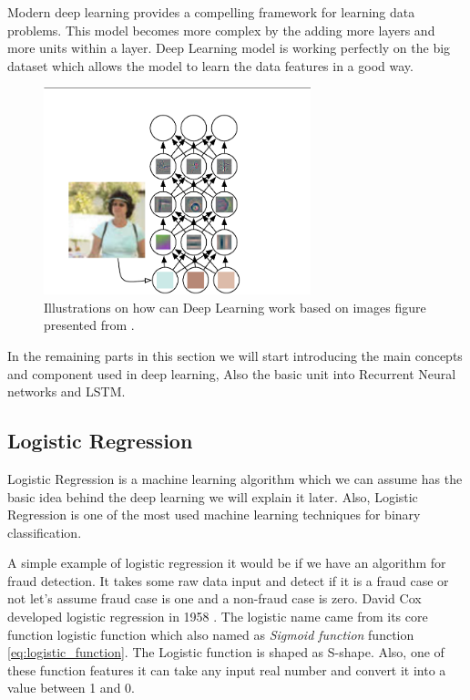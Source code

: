       
Modern deep learning provides a compelling framework for learning data problems. This model becomes more complex by the adding more layers and more units within a layer. Deep Learning model is working perfectly on the big dataset which allows the model to learn the data features in a good way.

\begin{figure} \includegraphics[width=\linewidth,height=6cm]{./Figures/DeepLearningImagePersonExample.png}
  \caption{Illustrations on how can Deep Learning work based on images figure presented from \cite{Goodfellow-et-al-2016} \cite{Zeiler2014}.}
  \label{fig:DeepLearningImagePersonExample.png}
\end{figure}

In the remaining parts in this section we will start introducing the main concepts and component used in deep learning, Also the basic unit into Recurrent Neural networks and LSTM.
\newpage

\subsection{Logistic Regression}
Logistic Regression is a machine learning algorithm which we can assume has the basic idea behind the deep learning we will explain it later. Also, Logistic Regression is one of the most used machine learning techniques for binary classification.

A simple example of logistic regression it would be if we have an algorithm for fraud detection. It takes some raw data input and detect if it is a fraud case or not let’s assume fraud case is one and a non-fraud case is zero. David Cox developed logistic regression in 1958 \cite{Cox2958}. The logistic name came from its core function logistic function which also named as \textit{Sigmoid function}  function \eqref{eq:logistic_function}. The Logistic function is shaped as S-shape. %
Also, one of these function features it can take any input real number and convert it into a value between 1 and 0.

